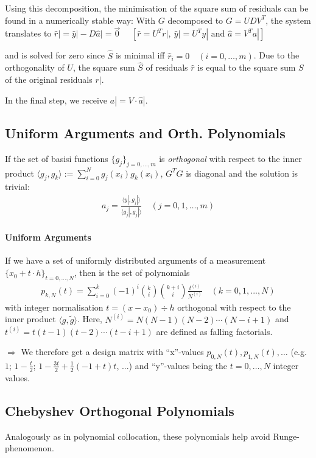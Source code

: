 Using this decomposition, the minimisation of the square sum of residuals can be found in a numerically stable way:
With $G$ decomposed to $G=UDV^T$, the system translates to
\colorbox{shadecolor}{
    $\hat{r}| = \hat{y}| - D\hat{a}| = \vec{0}\quad$
        {\color{darkgray} $\left[\hat{r} = U^Tr|,\ \hat{y}| = U^Ty|\text{ and }\hat{a} = V^Ta|\right]$}
}

and is solved for zero since $\hat{S}$ is minimal iff $\hat{r}_i=0\quad(i=0,\ldots,m)$.
Due to the orthogonality of $U$, the square sum $\hat{S}$ of residuals $\hat{r}$ is equal to the square sum $S$ of the original
residuals $r|$.

In the final step, we receive $a| = V\cdot\hat{a}|$.

\subsection{Uniform Arguments and Orth. Polynomials}

If the set of basisi functions $\{g_j\}_{j=0,\ldots,m}$ is \emph{orthogonal} with respect to the inner product
$\langle g_j,g_k\rangle := \sum_{i=0}^N g_j(x_i)g_k(x_i)$, $G^TG$ is diagonal and the solution is trivial:
\begin{align*}
    a_j=\frac{\langle y|, g_j|\rangle}{\langle g_j|, g_j|\rangle}\quad(j=0,1,\ldots,m)
\end{align*}

\paragraph{Uniform Arguments}
If we have a set of uniformly distributed arguments of a measurement $\{x_0 + t\cdot h\}_{t=0,\ldots,N}$,
then is the set of polynomials
\begin{align*}
    p_{k,N}(t)
    = \sum_{i=0}^{k}(-1)^{i}{\binom{k}{i}}{\binom{k+i}{i}}{\frac{t^{(i)}}{N^{(i)}}}\quad(k=0,1,...,N)
\end{align*}
with integer normalisation $t = (x-x_0)\div h$ orthogonal with respect to the inner product $\langle g,\tilde{g}\rangle$.
Here, $N^{(i)} = N(N-1)(N-2)\cdots(N-i+1)$ and $t^{(i)} = t(t-1)(t-2)\cdots(t-i+1)$ are defined as falling factorials.

$\Rightarrow$ We therefore get a design matrix with ``x''-values $p_{0,N}(t), p_{1,N}(t),\ldots$
(e.g. $1$; $1-\frac{t}{2}$; $1-\frac{3t}{2}+\frac{1}{2}(-1+t)t$, ...) and ``y''-values being the $t=0,\ldots,N$ integer values.

\subsection{Chebyshev Orthogonal Polynomials}
Analogously as in polynomial collocation, these polynomials help avoid Runge-phenomenon.

